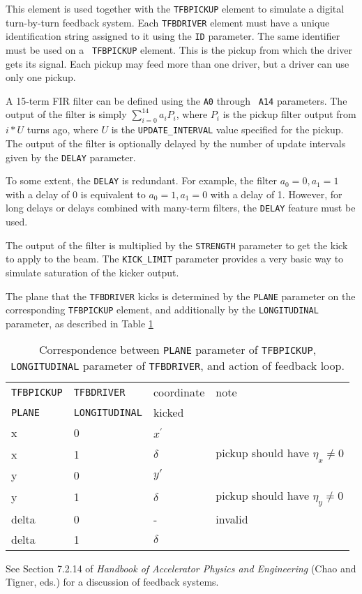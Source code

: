 This element is used together with the {\tt TFBPICKUP} element to
simulate a digital turn-by-turn feedback system.  Each {\tt TFBDRIVER}
element must have a unique identification string assigned to it using
the {\tt ID} parameter.  The same identifier must be used on a {\tt
TFBPICKUP} element.  This is the pickup from which the driver gets its
signal.  Each pickup may feed more than one driver, but a driver can
use only one pickup.

A 15-term FIR filter can be defined using the {\tt A0} through {\tt
A14} parameters.  The output of the filter is simply $\sum_{i=0}^{14}
a_i P_i$, where $P_i$ is the pickup filter output from $i*U$ turns ago,
where $U$ is the \verb|UPDATE_INTERVAL| value specified for the pickup.
The output of the filter is optionally delayed by the number of update intervals
given by the {\tt DELAY} parameter.

To some extent, the {\tt DELAY} is redundant.  For example, the filter
$a_0=0, a_1=1$ with a delay of 0 is equivalent to $a_0=1, a_1=0$ with
a delay of 1.  However, for long delays or delays combined with
many-term filters, the {\tt DELAY} feature must be used.

The output of the filter is multiplied by the {\tt STRENGTH} parameter
to get the kick to apply to the beam.  The {\tt KICK\_LIMIT} parameter
provides a very basic way to simulate saturation of the kicker output.

The plane that the \verb|TFBDRIVER| kicks is determined by the 
\verb|PLANE| parameter on the corresponding \verb|TFBPICKUP| element, and
additionally by the \verb|LONGITUDINAL| parameter, as described in 
Table \ref{tab:tfbdriver}

\begin{table}[htb]
\begin{tabular}{llll}
\hline
\verb|TFBPICKUP| & \verb|TFBDRIVER| & coordinate & note \\
\verb|PLANE| & \verb|LONGITUDINAL| & kicked & \\
\hline
x & 0 & $x^\prime$ & \\
x & 1 & $\delta$ & pickup should have $\eta_x\neq 0$ \\
y & 0 & $y\prime$ & \\
y & 1 & $\delta$ & pickup should have $\eta_y\neq 0$ \\
delta & 0 & - & invalid \\
delta & 1 & $\delta$ & \\
\hline
\end{tabular}
\caption{Correspondence between {\tt PLANE} parameter of {\tt TFBPICKUP}, {\tt LONGITUDINAL} parameter of {\tt TFBDRIVER}, and action of feedback loop.}
\label{tab:tfbdriver}
\end{table}

See Section 7.2.14 of {\em Handbook of Accelerator Physics and Engineering}
(Chao and Tigner, eds.) for a discussion of feedback systems.
